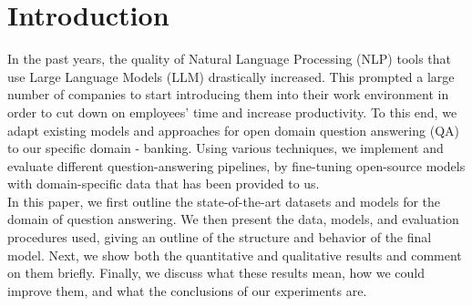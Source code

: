 \documentclass[fleqn,moreauthors,10pt]{ds_report}
\affiliation{\textit{Advisors: prof. dr. Marko Robnik Šikonja, Grega Jerkič, dr. Branislava Šandrih Todorović}}
\begin{document}
\flushbottom

\maketitle
\thispagestyle{empty}


\section*{Introduction}


    In the past years, the quality of Natural Language Processing (NLP) tools that use Large Language Models (LLM) drastically increased.
    This prompted a large number of companies to start introducing them into their work environment in order to cut down on employees' time and increase productivity.
    To this end, we adapt existing models and approaches for open domain question answering (QA) to our specific domain - banking.
    Using various techniques, we implement and evaluate different question-answering pipelines, by fine-tuning open-source models with domain-specific data that has been provided to us. \\
    In this paper, we first outline the state-of-the-art datasets and models for the domain of question answering. We then present the data, models, and evaluation procedures used, giving an outline of the structure and behavior of the final model. Next, we show both the quantitative and qualitative results and comment on them briefly. Finally, we discuss what these results mean, how we could improve them, and what the conclusions of our experiments are.
    
\end{document}
